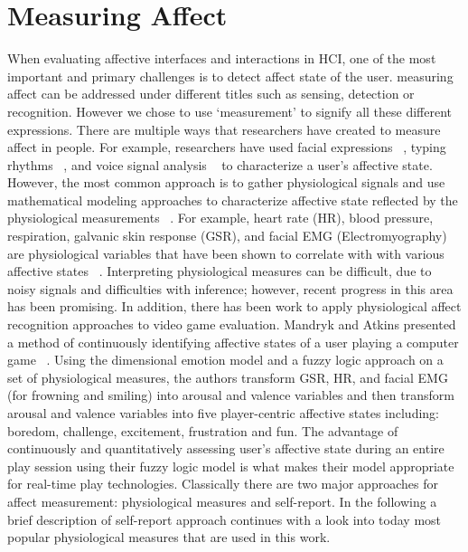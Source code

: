 \section{Measuring Affect}
When evaluating affective interfaces and interactions in HCI, one of the most important and primary challenges is to detect affect state of the user. measuring affect can be addressed under different titles such as sensing, detection or recognition. However we chose to use `measurement' to signify all these different expressions. There are multiple ways that researchers have created to measure affect in people. For example, researchers have used facial expressions ~\cite{partala2006real}, typing rhythms ~\cite{epp2011identifying}, and voice signal analysis ~\cite{picard2003affective} to characterize a user's affective state. However, the most common approach is to gather physiological signals and use mathematical modeling approaches to characterize affective state reflected by the physiological measurements ~\cite{mandryk2007fuzzy}. For example, heart rate (HR), blood pressure, respiration, galvanic skin response (GSR), and facial EMG (Electromyography) are physiological variables that have been shown to correlate with with various affective states ~\cite{mandryk2008physiological}. Interpreting physiological measures can be difficult, due to noisy signals and difficulties with inference; however, recent progress in this area has been promising. In addition, there has been work to apply physiological affect recognition approaches to video game evaluation. Mandryk and Atkins presented a method of continuously identifying affective states of a user playing a computer game ~\cite{mandryk2007fuzzy}. Using the dimensional emotion model and a fuzzy logic approach on a set of physiological measures, the authors transform GSR, HR, and facial EMG (for frowning and smiling) into arousal and valence variables and then transform arousal and valence variables into five player-centric affective states including: boredom, challenge, excitement, frustration and fun. The advantage of continuously and quantitatively assessing user's affective state during an entire play session using their fuzzy logic model is what makes their model appropriate for real-time play technologies. Classically there are two major approaches for affect measurement: physiological measures and self-report. In the following a brief description of self-report approach continues with a look into today most popular physiological measures that are used in this work.

